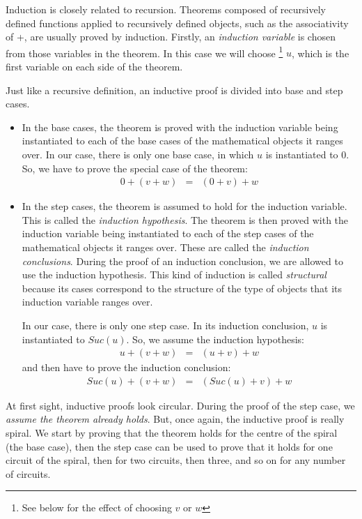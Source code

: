 \documentclass[twocolumn]{article}
\begin{document}
Induction is closely related to recursion. Theorems composed of recursively
defined functions applied to recursively defined objects, such as the
associativity of +, are usually proved by induction.  Firstly, an {\em induction
  variable} is chosen from those variables in the theorem.  In this case we will
choose \footnote{See below for the effect of choosing $v$ or $w$} $u$, which is
the first variable on each side of the theorem.

Just like a recursive definition, an inductive proof is divided into base and
step cases.
\begin{itemize}

\item In the base cases, the theorem is proved with the induction variable being
  instantiated to each of the base cases of the mathematical objects it ranges over. In
  our case, there is only one base case, in which $u$ is instantiated to
  $0$. So, we have to prove the special case of the theorem:
\begin{eqnarray*}
 0+(v+w) & = & (0+v)+w
\end{eqnarray*}

\item In the step cases, the theorem is assumed to hold for the induction
  variable. This is called the {\em induction hypothesis}. The theorem is then
  proved with the induction variable being instantiated to each of the step cases of the
  mathematical objects it ranges over. These are called the {\em induction
    conclusions}. During the proof of an induction conclusion, we are allowed to
  use the induction hypothesis. This kind of induction is called {\em
    structural} because its cases correspond to the structure of the type of
  objects that its induction variable ranges over.

  In our case, there is only one step case. In its induction conclusion, $u$ is
  instantiated to $Suc(u)$. So, we assume the induction hypothesis:
\begin{eqnarray}
 u+(v+w) & = & (u+v)+w \label{ih}
\end{eqnarray}
and then have to prove the induction conclusion:
\begin{eqnarray*}
 Suc(u)+(v+w) & = & (Suc(u)+v)+w
\end{eqnarray*}

\end{itemize}

 At first sight, inductive proofs look circular. During the proof of the step
case, we {\em assume the theorem already holds}. But, once again, the
inductive proof is really spiral. We start by proving that the theorem holds for
the centre of the spiral (the base case), then the step case can be used to
prove that it holds for one circuit of the spiral, then for two circuits, then
three, and so on for any number of circuits.
\end{document}
